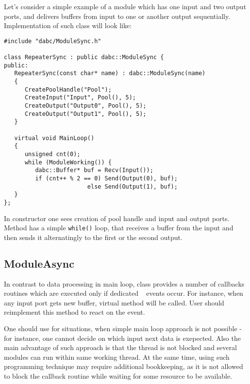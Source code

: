 Let's consider a simple example of a  module 
which has one input and two output ports, and delivers buffers from input to
one or another output sequentially. Implementation of such 
class will look like:
\begin{small}
\begin{verbatim}
#include "dabc/ModuleSync.h"

class RepeaterSync : public dabc::ModuleSync {
public:
   RepeaterSync(const char* name) : dabc::ModuleSync(name)
   {
      CreatePoolHandle("Pool");
      CreateInput("Input", Pool(), 5);
      CreateOutput("Output0", Pool(), 5);
      CreateOutput("Output1", Pool(), 5);
   }
     
   virtual void MainLoop()
   {
      unsigned cnt(0);
      while (ModuleWorking()) {
         dabc::Buffer* buf = Recv(Input());
         if (cnt++ % 2 == 0) Send(Output(0), buf);
                        else Send(Output(1), buf);
   }
};
\end{verbatim}
\end{small}

In constructor one sees creation of pool handle and input and output ports.
Method  has a simple {\tt while()} loop, 
that receives a buffer from the
input and then sends it alternatingly to the first or the second output.

  
\subsection{ModuleAsync}
\label{plugin_module_async}

In contrast to data processing in  main loop,
class  provides a
number of callbacks routines which are executed only if dedicated \dabc~ events occur.
For instance, when any input port gets new buffer, virtual method 
 will
be called. User should reimplement this method to react on the event.

One should use  for situations, when simple main loop approach
is not possible - for instance, one cannot decide on which input next data is exepected.  
Also the main advantage of such approach is that the thread is not blocked and
several  modules can run within same working thread.
At the same time, using such programming technique may require additional 
bookkeeping, as it is not allowed to block the callback routine while waiting for
some resource to be available.

